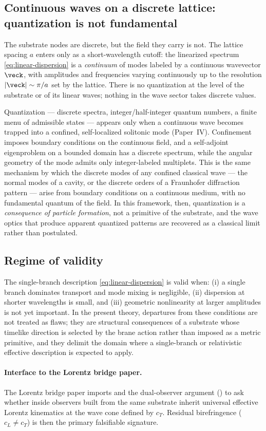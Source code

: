 \subsection{Continuous waves on a discrete lattice: quantization is not fundamental}
\label{subsec:continuous-waves}

The substrate nodes are discrete, but the field they carry is not.
The lattice spacing $a$ enters only as a short-wavelength cutoff: the linearized spectrum
\eqref{eq:linear-dispersion} is a \emph{continuum} of modes labeled by a continuous wavevector
$\veck$, with amplitudes and frequencies varying continuously up to the resolution
$|\veck|\sim\pi/a$ set by the lattice.
There is no quantization at the level of the substrate or of its linear waves; nothing in the wave
sector takes discrete values.

Quantization --- discrete spectra, integer/half-integer quantum numbers, a finite menu of
admissible states --- appears only when a continuous wave becomes trapped into a confined,
self-localized solitonic mode (Paper~IV).
Confinement imposes boundary conditions on the continuous field, and a self-adjoint eigenproblem on
a bounded domain has a discrete spectrum, while the angular geometry of the mode admits only
integer-labeled multiplets.
This is the same mechanism by which the discrete modes of any confined classical wave --- the
normal modes of a cavity, or the discrete orders of a Fraunhofer diffraction pattern --- arise from
boundary conditions on a continuous medium, with no fundamental quantum of the field.
In this framework, then, quantization is a \emph{consequence of particle formation}, not a
primitive of the substrate, and the wave optics that produce apparent quantized patterns are
recovered as a classical limit rather than postulated.

\subsection{Regime of validity}
\label{subsec:wave-regime}

The single-branch description \eqref{eq:linear-dispersion} is valid when:
(i) a single branch dominates transport and mode mixing is negligible,
(ii) dispersion at shorter wavelengths is small, and
(iii) geometric nonlinearity at larger amplitudes is not yet important.
In the present theory, departures from these conditions are not treated as flaws;
they are structural consequences of a substrate whose timelike direction is selected by
the brane action rather than imposed as a metric primitive, and they delimit the domain
where a single-branch or relativistic effective description is expected to apply.

\paragraph{Interface to the Lorentz bridge paper.}
The Lorentz bridge paper imports 
and the dual-observer argument () to ask whether inside
observers built from the same substrate inherit universal effective Lorentz kinematics
at the wave cone defined by $c_T$.
Residual birefringence ($c_L \neq c_T$) is then the primary falsifiable signature.